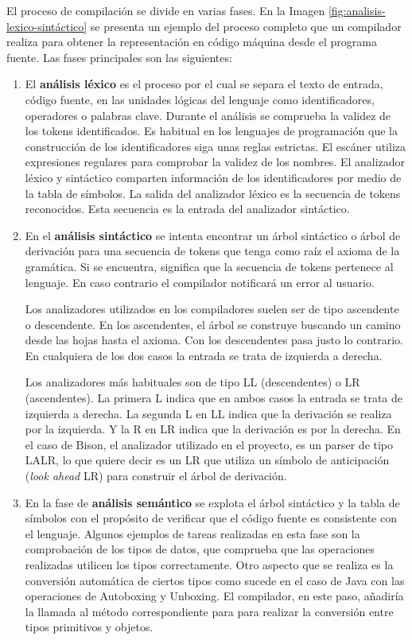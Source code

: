 El proceso de compilación se divide en varias fases. En la Imagen \ref{fig:analisis-lexico-sintáctico} se presenta un ejemplo del proceso completo que un compilador realiza para obtener la representación en código máquina desde el programa fuente. Las fases principales son las siguientes:

\begin{enumerate}
    \item El \textbf{análisis léxico} es el proceso por el cual se separa el texto de entrada, código fuente, en las unidades lógicas del lenguaje como identificadores, operadores o palabras clave. 
    Durante el análisis se comprueba la validez de los tokens identificados. Es habitual en los lenguajes de programación que la construcción de los identificadores siga unas reglas estrictas. El escáner utiliza expresiones regulares para comprobar la validez de los nombres.
    El analizador léxico y sintáctico comparten información de los identificadores por medio de la tabla de símbolos.
    La salida del analizador léxico es la secuencia de tokens reconocidos. Esta secuencia es la entrada del analizador sintáctico.
    
    \item En el \textbf{análisis sintáctico} se intenta encontrar un árbol sintáctico o árbol de derivación para una secuencia de tokens que tenga como raíz el axioma de la gramática. Si se encuentra, significa que la secuencia de tokens pertenece al lenguaje. En caso contrario el compilador notificará un error al usuario.
    
    Los analizadores utilizados en los compiladores suelen ser de tipo ascendente o descendente. En los ascendentes, el árbol se construye buscando un camino desde las hojas hasta el axioma. Con los descendentes pasa justo lo contrario. En cualquiera de los dos casos la entrada se trata de izquierda a derecha. 
    
    Los analizadores más habituales son de tipo LL (descendentes) o LR (ascendentes). La primera L indica que en ambos casos la entrada se trata de izquierda a derecha. La segunda L en LL indica que la derivación se realiza por la izquierda. Y la R en LR indica que la derivación es por la derecha. En el caso de Bison, el analizador utilizado en el proyecto, es un parser de tipo LALR, lo que quiere decir es un LR que utiliza un símbolo de anticipación (\emph{look ahead} LR) para construir el árbol de derivación. 

    \item En la fase de \textbf{análisis semántico} se explota el árbol sintáctico y la tabla de símbolos con el propósito de verificar que el código fuente es consistente con el lenguaje. Algunos ejemplos de tareas realizadas en esta fase son la comprobación de los tipos de datos, que comprueba que las operaciones realizadas utilicen los tipos correctamente. Otro aspecto que se realiza es la conversión automática de ciertos tipos como sucede en el caso de Java con las operaciones de Autoboxing y Unboxing. El compilador, en este paso, añadiría la llamada al método correspondiente para para realizar la conversión entre tipos primitivos y objetos.
    

\end{enumerate}
